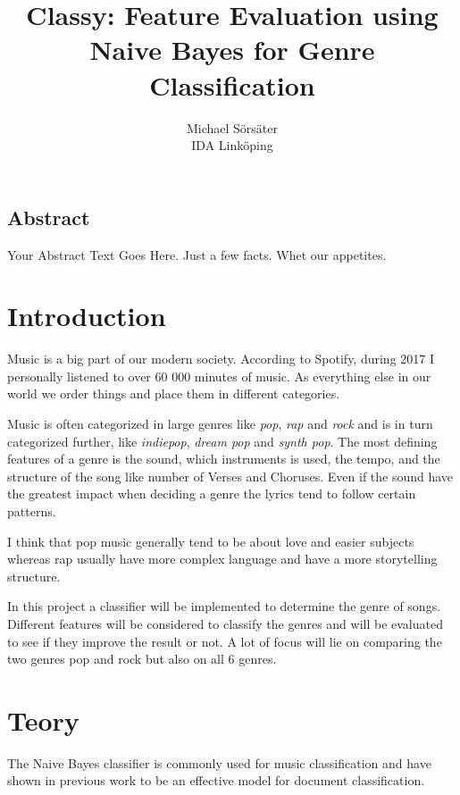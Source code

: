 \documentclass[a4paper, 12pt]{article}
\begin{document}
\date{}

\title{\Large Classy: Feature Evaluation using Naive Bayes for Genre Classification}

\author{
{Michael Sörsäter}\\
IDA Linköping
}

\maketitle


\subsection*{Abstract}
Your Abstract Text Goes Here.  Just a few facts.
Whet our appetites.

\section{Introduction}
Music is a big part of our modern society.
According to Spotify, during 2017 I personally listened to over 60 000 minutes of music. \cite{spotify}
As everything else in our world we order things and place them in different categories.

Music is often categorized in large genres like \textit{pop}, \textit{rap} and \textit{rock} and is in turn categorized further, like \textit{indiepop}, \textit{dream pop} and \textit{synth pop}.
The most defining features of a genre is the sound, which instruments is used, the tempo, and the structure of the song like number of Verses and Choruses.
Even if the sound have the greatest impact when deciding a genre the lyrics tend to follow certain patterns.

I think that pop music generally tend to be about love and easier subjects whereas rap usually have more complex language and have a more storytelling structure.

In this project a classifier will be implemented to determine the genre of songs.
Different features will be considered to classify the genres and will be evaluated to see if they improve the result or not.
A lot of focus will lie on comparing the two genres pop and rock but also on all 6 genres.

\section{Teory}
The Naive Bayes classifier is commonly used for music classification and have shown in previous work to be an effective model for document classification. \cite{Canicatti}
\end{document}
